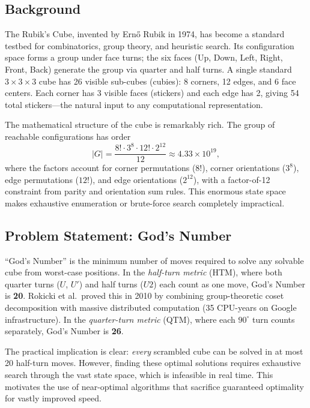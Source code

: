 \documentclass[10pt,twocolumn,a4paper]{article}
\begin{document}
\subsection{Background}
The Rubik's Cube, invented by Ern\H{o} Rubik in 1974, has become a standard testbed for combinatorics, group theory, and heuristic search. Its configuration space forms a group under face turns; the six faces (Up, Down, Left, Right, Front, Back) generate the group via quarter and half turns. A single standard $3{\times}3{\times}3$ cube has 26 visible sub-cubes (cubies): 8 corners, 12 edges, and 6 face centers. Each corner has 3 visible faces (stickers) and each edge has 2, giving 54 total stickers---the natural input to any computational representation.

The mathematical structure of the cube is remarkably rich. The group of reachable configurations has order
\begin{equation}
|G| = \frac{8! \cdot 3^8 \cdot 12! \cdot 2^{12}}{12} \approx 4.33 \times 10^{19},
\end{equation}
where the factors account for corner permutations ($8!$), corner orientations ($3^8$), edge permutations ($12!$), and edge orientations ($2^{12}$), with a factor-of-12 constraint from parity and orientation sum rules. This enormous state space makes exhaustive enumeration or brute-force search completely impractical.

\subsection{Problem Statement: God's Number}
``God's Number'' is the minimum number of moves required to solve any solvable cube from worst-case positions. In the \emph{half-turn metric} (HTM), where both quarter turns ($U$, $U'$) and half turns ($U2$) each count as one move, God's Number is \textbf{20}. Rokicki et al.\ proved this in 2010 by combining group-theoretic coset decomposition with massive distributed computation (35 CPU-years on Google infrastructure). In the \emph{quarter-turn metric} (QTM), where each $90^\circ$ turn counts separately, God's Number is \textbf{26}.

The practical implication is clear: \emph{every} scrambled cube can be solved in at most 20 half-turn moves. However, finding these optimal solutions requires exhaustive search through the vast state space, which is infeasible in real time. This motivates the use of near-optimal algorithms that sacrifice guaranteed optimality for vastly improved speed.
\end{document}
